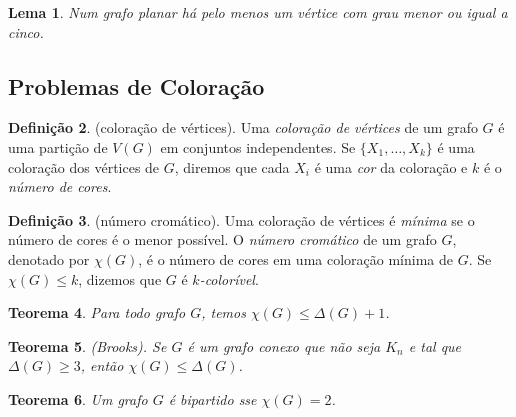 \documentclass{article}
\theoremstyle{plain}
\newtheorem{thm}{Teorema}[section]
\newtheorem{lem}[thm]{Lema}
\theoremstyle{definition}
\newtheorem{defn}[thm]{Definição}
\theoremstyle{remark}
\begin{document}
\begin{lem}
    Num grafo planar há pelo menos um vértice com grau menor ou igual a cinco.
\end{lem}

\subsection{Problemas de Coloração}

\begin{defn} (coloração de vértices).
    Uma \emph{coloração de vértices} de um grafo \(G\) é uma partição de \(V(G)\) em conjuntos independentes. Se \(\{X_1, \ldots, X_k\}\) é uma coloração dos vértices de \(G\), diremos que cada \(X_i\) é uma \emph{cor} da coloração e \(k\) é o \emph{número de cores}.
\end{defn}

\begin{defn} (número cromático).
    Uma coloração de vértices é \emph{mínima} se o número de cores é o menor possível. O \emph{número cromático} de um grafo \(G\), denotado por \(\chi(G)\), é o número de cores em uma coloração mínima de \(G\).
    Se \(\chi(G) \leq k\), dizemos que \(G\) é \emph{\(k\)-colorível}.
\end{defn}

\begin{thm}
    Para todo grafo \(G\), temos \(\chi(G) \leq \Delta(G) + 1\).
\end{thm}

\begin{thm} (Brooks).
    Se \(G\) é um grafo conexo que não seja \(K_n\) e tal que \(\Delta(G) \geq 3\), então \(\chi(G) \leq \Delta(G)\).
\end{thm}

\begin{thm}
    Um grafo \(G\) é bipartido sse \(\chi(G) = 2\).
\end{thm}
\end{document}
